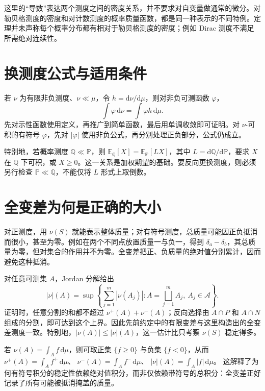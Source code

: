 \documentclass[UTF8,12pt,a4paper,fontset=fandol]{ctexbook}
\begin{document}
这里的“导数”表达两个测度之间的密度关系，并不要求对自变量做通常的微分。对勒贝格测度的密度和对计数测度的概率质量函数，都是同一种表示的不同特例。定理并未声称每个概率分布都有相对于勒贝格测度的密度；例如 Dirac 测度不满足所需绝对连续性。

\section{换测度公式与适用条件}
若 $\nu$ 为有限非负测度、$\nu\ll\mu$，令 $h=\mathrm d\nu/\mathrm d\mu$，则对非负可测函数 $\varphi$，
\begin{equation}
 \int\varphi\,\mathrm d\nu=\int\varphi h\,\mathrm d\mu.
 \label{eq:mt-change-measure}
\end{equation}
先对示性函数使用定义，再推广到简单函数，最后用单调收敛即可证明。对 $\nu$-可积的有符号 $\varphi$，先对 $|\varphi|$ 使用非负公式，再分别处理正负部分，公式仍成立。

特别地，若概率测度 $\mathbb Q\ll\mathbb P$，则
$\mathbb E_{\mathbb Q}[X]=\mathbb E_{\mathbb P}[LX]$，其中
$L=\mathrm d\mathbb Q/\mathrm d\mathbb P$，要求 $X$ 在 $\mathbb Q$ 下可积，或 $X\geq0$。这一关系是加权期望的基础。要反向更换测度，则必须另行检查 $\mathbb P\ll\mathbb Q$，不能仅将 $L$ 形式上取倒数。

\section{全变差为何是正确的大小}
对正测度，用 $\nu(S)$ 就能表示整体质量；对有符号测度，总质量可能因正负抵消而很小，甚至为零。例如在两个不同点放置质量一与负一，得到 $\delta_a-\delta_b$，其总质量为零，但对集合的作用并不为零。全变差把正、负质量的绝对值分别累计，因而避免这种抵消。

对任意可测集 $A$，Jordan 分解给出
\[
 |\nu|(A)=\sup\left\{\sum_{j=1}^{m}|\nu(A_j)|:
 A=\bigsqcup_{j=1}^{m}A_j,\ A_j\in\mathcal A\right\}.
\]
证明时，任意分割的和都不超过 $\nu^+(A)+\nu^-(A)$；反向选择由 $A\cap P$ 和 $A\cap N$ 组成的分割，即可达到这个上界。因此先前约定中的有限变差与这里构造出的全变差测度一致。特别地，$|\nu(A)|\leq|\nu|(A)$，这一估计比只考察 $\nu(S)$ 稳定得多。

若 $\nu(A)=\int_Af\,\mathrm d\mu$，则可取正集 $\{f\geq0\}$ 与负集 $\{f<0\}$，从而
$\nu^+(A)=\int_Af^+\,\mathrm d\mu$、
$\nu^-(A)=\int_Af^-\,\mathrm d\mu$、
$|\nu|(A)=\int_A|f|\,\mathrm d\mu$。
这解释了为何有符号积分的稳定性依赖绝对值积分，而非仅依赖带符号的总积分：全变差正好记录了所有可能被抵消掩盖的质量。
\end{document}
